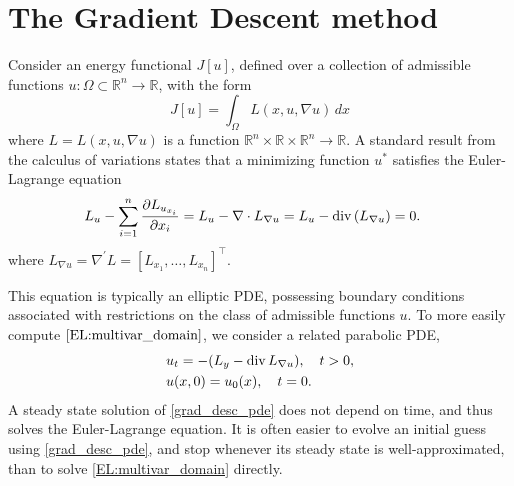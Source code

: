 \label{lab:tv_images}




\section*{The Gradient Descent method}
Consider an energy functional $J[u]$, defined over a collection of admissible functions $u:\Omega \subset \mathbb{R}^n \to \mathbb{R}$, with the form 
\[J[u] = \int_{\Omega} L(x,u,\nabla u) \, dx\]
where $L = L(x,u,\nabla u)$ is a function $\mathbb{R}^n \times \mathbb{R} \times \mathbb{R}^n \to \mathbb{R}$. 
A standard result from the calculus of variations states that a minimizing function $u^*$ satisfies the Euler-Lagrange equation
\begin{align}
L_u-\sum_{i=1}^n\frac{\partial L_{u_{x_i}}}{\partial x_i}=L_u-\nabla\cdot L_{\nabla u}=L_u - {\rm div}\,(L_{\nabla u}) &= 0.	\label{EL:multivar_domain}
\end{align}
where $L_{\nabla u} = \nabla^\prime L = [L_{x_1},\hdots,L_{x_n}]^\intercal$.

This equation is typically an elliptic PDE, possessing boundary conditions associated with  restrictions on the class of admissible functions $u$.
To more easily compute $\eqref{EL:multivar_domain}$, we consider a related parabolic PDE,
\begin{align}
	\begin{split}
	&{ } u_t = -(L_y - {\rm div}\, L_{\nabla u}), \quad t > 0,\\
	&{ } u(x,0) = u_0(x), \quad t = 0. 
	\end{split} \label{grad_desc_pde}
\end{align}
A steady state solution of \eqref{grad_desc_pde} does not depend on time, and thus solves the Euler-Lagrange equation. 
It is often easier to evolve an initial guess using \eqref{grad_desc_pde}, and stop whenever its steady state is well-approximated, than to solve \eqref{EL:multivar_domain} directly. 


